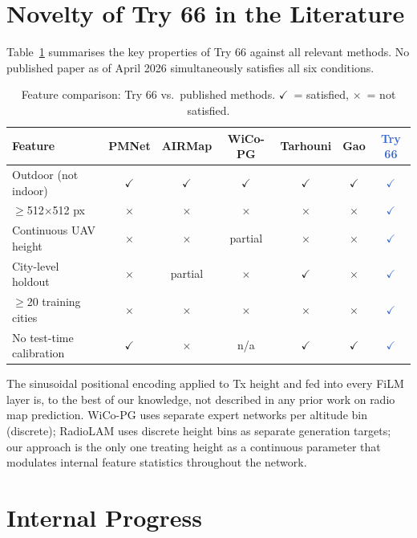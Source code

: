 \documentclass[11pt,a4paper]{article}
\newcommand{\ours}[1]{\textcolor{highlight}{\textbf{#1}}}
\newcommand{\yes}{$\checkmark$}
\newcommand{\no}{$\times$}
\begin{document}
\section{Novelty of Try 66 in the Literature}
\label{sec:novelty}

Table~\ref{tab:novelty} summarises the key properties of Try 66 against all
relevant methods. No published paper as of April 2026 simultaneously satisfies
all six conditions.

\begin{table}[h!]
\centering
\caption{Feature comparison: Try 66 vs.\ published methods.
\yes~= satisfied, \no~= not satisfied.}
\label{tab:novelty}
\small
\begin{tabular}{lcccccc}
\toprule
\textbf{Feature} & \textbf{PMNet} & \textbf{AIRMap} & \textbf{WiCo-PG}
    & \textbf{Tarhouni} & \textbf{Gao} & \ours{\textbf{Try 66}} \\
\midrule
Outdoor (not indoor) & \yes & \yes & \yes & \yes & \yes & \ours{\yes} \\
$\geq$512$\times$512 px & \no & \no & \no & \no & \no & \ours{\yes} \\
Continuous UAV height & \no & \no & partial & \no & \no & \ours{\yes} \\
City-level holdout & \no & partial & \no & \yes & \no & \ours{\yes} \\
$\geq$20 training cities & \no & \no & \no & \no & \no & \ours{\yes} \\
No test-time calibration & \yes & \no & n/a & \yes & \yes & \ours{\yes} \\
\bottomrule
\end{tabular}
\end{table}

The sinusoidal positional encoding applied to Tx height and fed into every
FiLM layer is, to the best of our knowledge, not described in any prior work
on radio map prediction. WiCo-PG uses separate expert networks per altitude bin
(discrete); RadioLAM \cite{radiolam2025} uses discrete height bins as separate
generation targets; our approach is the only one treating height as a continuous
parameter that modulates internal feature statistics throughout the network.

\section{Internal Progress}
\label{sec:progress}
\end{document}
